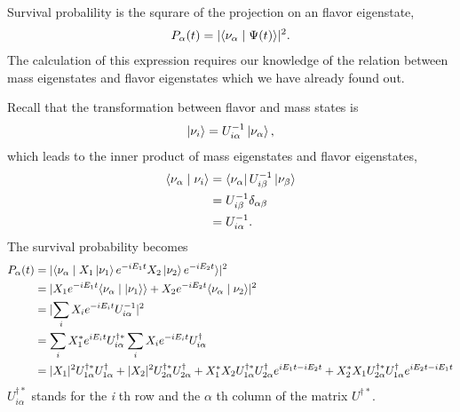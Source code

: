 \documentclass[letterpaper,12pt,english]{sphinxmanual}
\newcommand{\bra}[1]{\left\langle #1\right|}
\newcommand{\ket}[1]{\left| #1\right\rangle}
\newcommand{\braket}[2]{\langle #1 \mid #2 \rangle}
\begin{document}
Survival probalility is the squrare of the projection on an flavor eigenstate,
\begin{gather}
\begin{split}P_{\alpha}(t) = \lvert \braket{\nu_{\alpha}}{\Psi(t)} \rvert^2.\end{split}\notag
\end{gather}
The calculation of this expression requires our knowledge of the relation between mass eigenstates and flavor eigenstates which we have already found out.

Recall that the transformation between flavor and mass states is
\begin{gather}
\begin{split}\ket{\nu_i} = U^{-1}_{i\alpha} \ket{\nu_\alpha},\end{split}\notag
\end{gather}
which leads to the inner product of mass eigenstates and flavor eigenstates,
\begin{gather}
\begin{split}\braket{\nu_\alpha}{\nu_i} &= \bra{\nu_\alpha} U^{-1}_{i\beta} \ket{\nu_\beta} \\
& = U^{-1}_{i\beta}\delta_{\alpha\beta} \\
& = U^{-1}_{i\alpha}.\end{split}\notag
\end{gather}
The survival probability becomes
\begin{gather}
\begin{split}P_\alpha (t) &= \lvert \braket{\nu_\alpha}{ X_1 \ket{\nu_1 } e^{-i E_1 t} X_2 \ket{ \nu_2 } e^{-i E_2 t} }  \rvert^2 \\
& = \lvert  X_1 e^{-i E_1 t} \braket{\nu_\alpha}{\ket{\nu_1} } + X_2 e^{-i E_2 t} \braket{ \nu_\alpha }{ \nu_2 } \rvert^2 \\
& = \lvert \sum_i X_i e^{-i E_i t} U^{-1}_{i \alpha}  \rvert ^2 \\
& = \sum_i X_1^* e^{iE_i t} U^{\dagger *}_{i\alpha} \sum_i X_i e^{-i E_i t} U^\dagger_{i \alpha} \\
& = \lvert X_1 \rvert^2 U^{\dagger * } _ {1\alpha} U^\dagger_{1\alpha} + \lvert X_2 \rvert^2 U^{\dagger * } _ {2\alpha} U^\dagger_{2\alpha}  + X_1^* X_2 U^{\dagger * }_{1\alpha} U^\dagger_{2\alpha} e^{i E_1 t - i E_2 t} + X_2^* X_1 U^{\dagger * }_{2\alpha} U^\dagger_{1\alpha} e^{i E_2 t - i E_1 t}\end{split}\notag
\end{gather}
\(U^{\dagger *}_{i\alpha}\) stands for the \emph{i} th row and the \(\alpha\) th column of the matrix \(U^{\dagger *}\).
\end{document}
